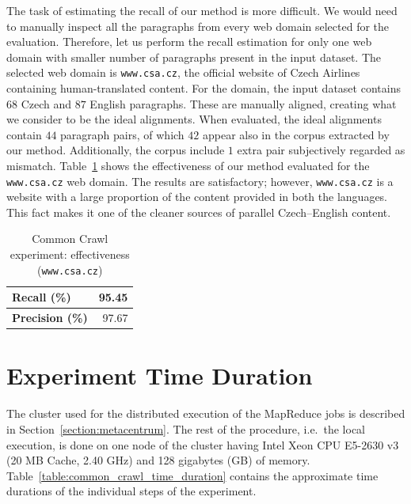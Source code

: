 The task of estimating the recall of our method is more difficult. We would need to manually inspect all the paragraphs from every web domain selected for the evaluation. Therefore, let us perform the recall estimation for only one web domain with smaller number of paragraphs present in the input dataset. The selected web domain is \texttt{www.csa.cz}, the official website of Czech Airlines containing human-translated content. For the domain, the input dataset contains $68$ Czech and $87$ English paragraphs. These are manually aligned, creating what we consider to be the ideal alignments. When evaluated, the ideal alignments contain $44$ paragraph pairs, of which $42$ appear also in the corpus extracted by our method. Additionally, the corpus include $1$ extra pair subjectively regarded as mismatch. Table~\ref{table:common_crawl_effectiveness} shows the effectiveness of our method evaluated for the \texttt{www.csa.cz} web domain. The results are satisfactory; however, \texttt{www.csa.cz} is a website with a large proportion of the content provided in both the languages. This fact makes it one of the cleaner sources of parallel Czech--English content.

\begin{table}[!htb]
	\centering
	\caption{Common Crawl experiment: effectiveness (\texttt{www.csa.cz})}
	\label{table:common_crawl_effectiveness}
	\vspace{1em}
	\begin{tabular}{|l|r|}
		\hline
		\textbf{Recall (\%)} & 95.45 \\
		\hline
		\textbf{Precision (\%)} & 97.67 \\
		\hline
	\end{tabular}
	\vspace{2em} 
\end{table}

\section{Experiment Time Duration}
\label{section:common_crawl_experiment_duration}

The cluster used for the distributed execution of the MapReduce jobs is described in Section~\ref{section:metacentrum}. The rest of the procedure, i.e.\ the local execution, is done on one node of the cluster having Intel\textregistered{} Xeon\textregistered{} CPU E5-2630 v3 (20 MB Cache, 2.40 GHz) and 128 gigabytes (GB) of memory. Table~\ref{table:common_crawl_time_duration} contains the approximate time durations of the individual steps of the experiment.

